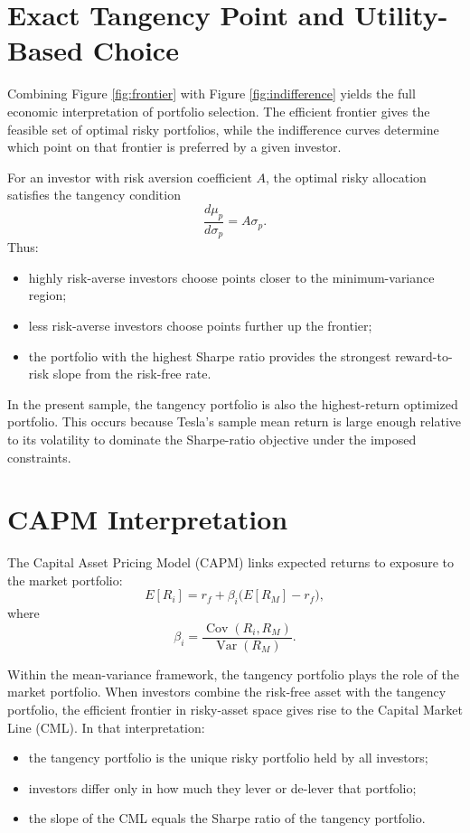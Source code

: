 \documentclass[wcp]{jmlr}
\begin{document}
\section{Exact Tangency Point and Utility-Based Choice}

Combining Figure \ref{fig:frontier} with Figure \ref{fig:indifference} yields the full economic interpretation of portfolio selection. The efficient frontier gives the feasible set of optimal risky portfolios, while the indifference curves determine which point on that frontier is preferred by a given investor.

For an investor with risk aversion coefficient $A$, the optimal risky allocation satisfies the tangency condition
\begin{equation}
\frac{d\mu_p}{d\sigma_p} = A \sigma_p.
\end{equation}
Thus:
\begin{itemize}
\item highly risk-averse investors choose points closer to the minimum-variance region;
\item less risk-averse investors choose points further up the frontier;
\item the portfolio with the highest Sharpe ratio provides the strongest reward-to-risk slope from the risk-free rate.
\end{itemize}

In the present sample, the tangency portfolio is also the highest-return optimized portfolio. This occurs because Tesla’s sample mean return is large enough relative to its volatility to dominate the Sharpe-ratio objective under the imposed constraints.

\section{CAPM Interpretation}

The Capital Asset Pricing Model (CAPM) links expected returns to exposure to the market portfolio:
\begin{equation}
E[R_i] = r_f + \beta_i \big(E[R_M] - r_f\big),
\end{equation}
where
\begin{equation}
\beta_i = \frac{\operatorname{Cov}(R_i, R_M)}{\operatorname{Var}(R_M)}.
\end{equation}

Within the mean-variance framework, the tangency portfolio plays the role of the market portfolio. When investors combine the risk-free asset with the tangency portfolio, the efficient frontier in risky-asset space gives rise to the Capital Market Line (CML). In that interpretation:
\begin{itemize}
\item the tangency portfolio is the unique risky portfolio held by all investors;
\item investors differ only in how much they lever or de-lever that portfolio;
\item the slope of the CML equals the Sharpe ratio of the tangency portfolio.
\end{itemize}
\end{document}
